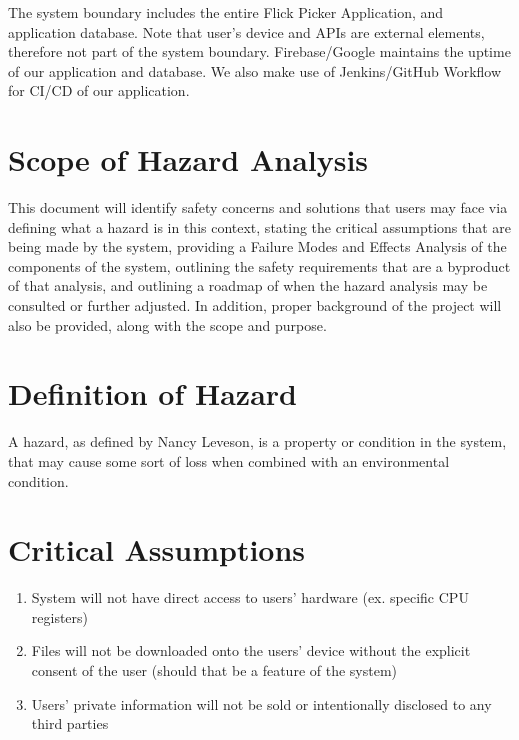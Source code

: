 \documentclass[12pt]{article}
\begin{document}
\noindent The system boundary includes the entire Flick Picker Application, and application database. Note that user's device and APIs are external elements, therefore not part of the system boundary. Firebase/Google maintains the uptime of our application and database. We also make use of Jenkins/GitHub Workflow for CI/CD of our application.

\section{Scope of Hazard Analysis}
This document will identify safety concerns and solutions that users may face via defining what a hazard is in this context, stating the critical assumptions that are being made by the system, providing a Failure Modes and Effects Analysis of the components of the system, outlining the safety requirements that are a byproduct of that analysis, and outlining a roadmap of when the hazard analysis may be consulted or further adjusted. In addition, proper background of the project will also be provided, along with the scope and purpose.

\section{Definition of Hazard}
A hazard, as defined by Nancy Leveson, is a property or condition in the system, that may cause some sort of loss when combined with an environmental condition.

\section{Critical Assumptions}
\begin{enumerate}
	\item System will not have direct access to users' hardware (ex. specific CPU registers)
	\item Files will not be downloaded onto the users' device without the explicit consent of the user (should that be a feature of the system)
	\item Users' private information will not be sold or intentionally disclosed to any third parties
\end{enumerate}
\end{document}
